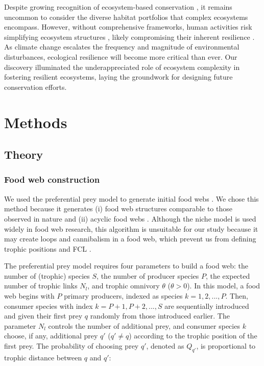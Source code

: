 \documentclass[11pt, class=article, crop=false]{standalone}
\begin{document}
Despite growing recognition of ecosystem-based conservation \citep{schindler_portfolio_2015}, it remains uncommon to consider the diverse habitat portfolios that complex ecosystems encompass.
However, without comprehensive frameworks, human activities risk simplifying ecosystem structures \citep{turner_landscape_2015, grill_mapping_2019}, likely compromising their inherent resilience \citep{turner_landscape_2015}.
As climate change escalates the frequency and magnitude of environmental disturbances, ecological resilience will become more critical than ever.
Our discovery illuminated the underappreciated role of ecosystem complexity in fostering resilient ecosystems, laying the groundwork for designing future conservation efforts.

\newpage

\section{Methods}

\subsection{Theory}

\subsubsection{Food web construction}

We used the preferential prey model to generate initial food webs \citep{johnson_trophic_2014}.
We chose this method because it generates (i) food web structures comparable to those observed in nature and (ii) acyclic food webs \citep{shibasaki_food_2024}.
Although the niche model \citep{williams_simple_2000} is used widely in food web research, this algorithm is unsuitable for our study because it may create loops and cannibalism in a food web, which prevent us from defining trophic positions and FCL \citep{shibasaki_food_2024}.

The preferential prey model requires four parameters to build a food web: the number of (trophic) species $S$, the number of producer species $P$, the expected number of trophic links $N_l$, and trophic omnivory $\theta$ ($\theta > 0$).
In this model, a food web begins with $P$ primary producers, indexed as species $k = 1, 2, ..., P$.
Then, consumer species with index $k = P + 1, P + 2, ..., S$ are sequentially introduced and given their first prey $q$ randomly from those introduced earlier.
The parameter $N_l$ controls the number of additional prey, and consumer species $k$ choose, if any, additional prey $q'$ ($q' \ne q$) according to the trophic position of the first prey.
The probability of choosing prey $q'$, denoted as $Q_{q'}$, is proportional to trophic distance between $q$ and $q'$:
\end{document}
